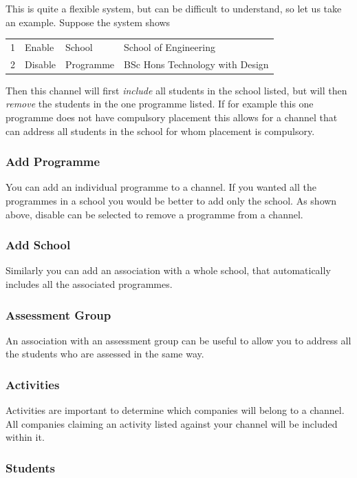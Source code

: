 \documentclass[12 pt]{book}
\begin{document}
This is quite a flexible system, but can be difficult to understand, so
let us take an example. Suppose the system shows

\begin{tabular}{llll}
1 & Enable & School & School of Engineering \\
2 & Disable & Programme & BSc Hons Technology with Design \\
\end{tabular}

Then this channel will first \emph{include} all students in the school listed,
but will then \emph{remove} the students in the one programme listed. If for
example this one programme does not have compulsory placement this allows for
a channel that can address all students in the school for whom placement is
compulsory.

\subsubsection{Add Programme}

You can add an individual programme to a channel. If you wanted all the
programmes in a school you would be better to add only the school. As shown
above, disable can be selected to remove a programme from a channel.

\subsubsection{Add School}

Similarly you can add an association with a whole school, that automatically
includes all the associated programmes.

\subsubsection{Assessment Group}

An association with an assessment group can be useful to allow you to address
all the students who are assessed in the same way.

\subsubsection{Activities}

Activities are important to determine which companies will belong to a channel.
All companies claiming an activity listed against your channel will be
included within it.

\subsubsection{Students}
\end{document}
